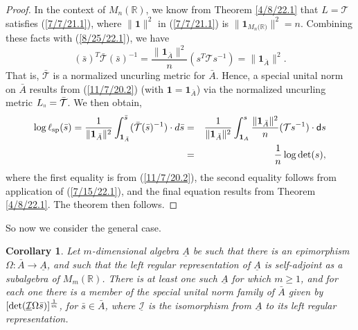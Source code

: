 \documentclass{amsart}
\numberwithin{equation}{section}
\newtheorem{corollary}[theorem]{Corollary}
\theoremstyle{definition}
\numberwithin{theorem}{section}
\begin{document}
\begin{proof}
In the context of $M_n(\mathbb{R})$, we know from Theorem \ref{4/8/22.1} that $L=\mathcal{T}$ satisfies (\ref{7/7/21.1}), where $\|\mathbf{1}\|^2$ in  (\ref{7/7/21.1}) is $\|\mathbf{1}_{M_n({\mathbb{R})}}\|^2 = n$.  Combining these facts with (\ref{8/25/22.1}), we have \begin{equation}\label{9/27/23.1} (\bar{s})^T \bar{\mathcal{T}} (\bar{s})^{-1} = \frac{\|\mathbf{1}_{\bar{A}}\|^2}{n}( s^T \mathcal{T} s^{-1}) = \|\mathbf{1}_{\bar{A}}\|^2 .\end{equation} 
That is, $\mathcal{\bar{T}}$ is a normalized uncurling metric for $\bar{A}$.  Hence, a special unital norm on $\bar{A}$ results from (\ref{11/7/20.2}) (with $\mathbf{1}=\mathbf{1}_{\bar{A}}$)  via the normalized uncurling metric $L_{\shortparallel} = \bar{\mathcal{T}}$.  
  We then obtain, 
\begin{eqnarray}\nonumber \log\ell_{\rm sp}(\bar{s}) = \frac{1}{\|\mathbf{1}_{\bar{A}}\|^2} \int_{\mathbf{1}_{\bar{A}}}^{\bar{s}} (\bar{\mathcal{T}}(\bar{s})^{-1})\cdot d\bar{s}
 &=& \frac{1}{\|\mathbf{1}_{\bar{A}}\|^2} \int_{\mathbf{1}_{A}}^{s} \frac{\|\mathbf{1}_{\bar{A}}\|^2}{n}(\mathcal{T}s^{-1})\cdot {\sf d}s \\ &=& \frac{1}{n} \log\text{det}(s),\label{9/27/23.2}\end{eqnarray} where the first equality is from (\ref{11/7/20.2}), the second equality follows from application of (\ref{7/15/22.1}), and the final equation results from Theorem \ref{4/8/22.1}.
The theorem then follows. 
 \end{proof} 
 

So now we consider the general case.
 
  \begin{corollary}\label{11/17/22.1}
  Let $m$-dimensional algebra $\underline{A}$ be such that there is an epimorphism $\Omega:\bar{A}\rightarrow \underline{A}$, and such that the left regular representation of $\underline{A}$ is self-adjoint as a subalgebra of $M_m(\mathbb{R})$. There is at least one such $\underline{A}$ for which $m\ge 1$, and for each one there is a member of the special unital norm family of  $\bar{A}$ given by $[{\rm det}(\underline{\mathcal{I}}\Omega \bar{s})]^{\frac{1}{m}}$, for $\bar{s}\in\bar{A}$, where $\underline{\mathcal{I}}$ is the isomorphism from $\underline{A}$ to its left regular representation.
  \end{corollary}
 
\end{document}
